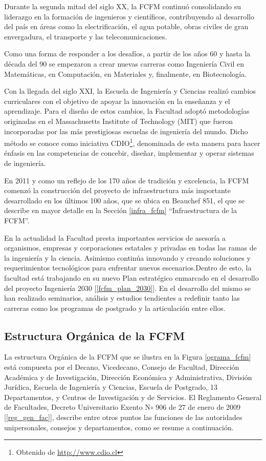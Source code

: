 Durante la segunda mitad del siglo XX, la FCFM continuó consolidando su liderazgo
en la formación de ingenieros y científicos, contribuyendo al desarrollo del país en áreas
como la electrificación, el agua potable, obras civiles de gran envergadura, el transporte y las
telecomunicaciones.

Como una forma de responder a los desafíos, a partir de los años 60 y hasta la década del 90
se empezaron a crear nuevas carreras como Ingeniería Civil en Matemáticas, en Computación, en
Materiales y, finalmente, en Biotecnología.

Con la llegada del siglo XXI, la Escuela de Ingeniería y Ciencias realizó cambios curriculares
con el objetivo de apoyar la innovación en la enseñanza y el aprendizaje. Para el diseño de estos
cambios, la Facultad adoptó metodologías originadas en el Massachusetts Institute of Technology
(MIT) que fueron incorporadas por las más prestigiosas escuelas de ingeniería del mundo. Dicho
método se conoce como iniciativa CDIO\footnote{Obtenido de \url{http://www.cdio.cl}}, denominada de esta manera para hacer énfasis en las
competencias de concebir, diseñar, implementar y operar sistemas de ingeniería.

En 2011 y como un reflejo de los 170 años de tradición y excelencia, la FCFM comenzó
la construcción del proyecto de infraestructura más importante desarrollado en los últimos 100
años, que se ubica en Beauchef 851, el que se describe en mayor detalle en la Sección \ref{infra_fcfm}
``Infraestructura de la FCFM''.

En la actualidad la Facultad presta importantes servicios de asesoría a organismos, empresas
y corporaciones estatales y privadas en todas las ramas de la ingeniería y la ciencia. Asimismo
continúa innovando y creando soluciones y requerimientos tecnológicos para enfrentar nuevos
escenarios.Dentro de esto, la facultad está trabajando en su nuevo Plan estratégico enmarcado en
el desarrollo del proyecto Ingeniería 2030 [\ref{fcfm_plan_2030}]. En el desarrollo del mismo se han realizado
seminarios, análisis y estudios tendientes a redefinir tanto las carreras como los programas de
postgrado y la articulación entre ellos.

\subsection{Estructura Orgánica de la FCFM}
\label{estruct_org_fcfm}

La estructura Orgánica de la FCFM que se ilustra en la Figura \ref{ograma_fcfm} está compuesta por el Decano,
Vicedecano, Consejo de Facultad, Dirección Académica y de Investigación, Dirección Económica
y Administrativa, División Jurídica, Escuela de Ingeniería y Ciencias, Escuela de Postgrado, 13
Departamentos, y Centros de Investigación y de Servicios. El Reglamento General de Facultades,
Decreto Universitario Exento N$\circ$ 906 de 27 de enero de 2009 [\ref{reg_gen_fac}], describe entre otros puntos
las funciones de las autoridades unipersonales, consejos y departamentos, como se resume a
continuación.

